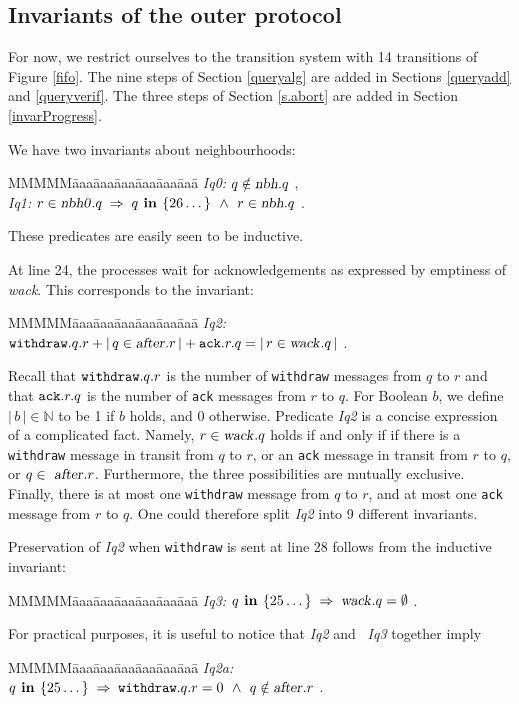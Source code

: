 \documentclass[10pt]{article} \usepackage[english]{babel}
\newenvironment{tab}{\begin{tabbing}
MMMMM\=aaa\=aaa\=aaa\=aaa\=aaa\=aaa\= \kill}{\end{tabbing}}
\def\Nat   {\mbox{$\mathbb{N}$}}
\def\S #1/{\mbox {\textsl{#1}}}
\def\B #1/{\mbox {\textbf{#1}}}
\def\T #1/{\mbox {\texttt{#1}}}
\def\Implies{\;\Rightarrow\;}
\def\Land   {\mbox{ $\;\land\;$ }}
\begin{document}
\subsection {Invariants of the outer protocol}
\label{InvOuter} 

For now, we restrict ourselves to the transition system with 14
transitions of Figure \ref{fifo}.  The nine steps of Section
\ref{queryalg} are added in Sections \ref{queryadd} and
\ref{queryverif}.  The three steps of Section \ref{s.abort} are added
in Section \ref{invarProgress}.

We have two invariants about neighbourhoods:
\begin{tab}
\S Iq0:/ \> $ q\notin \S nbh/.q$ ,\\
\S Iq1:/ \> $ r\in \S nbh0/.q \Implies q\B\ in /\{26\dots\} 
\Land r\in \S nbh/.q$ . 
\end{tab}
These predicates are easily seen to be inductive.

At line 24, the processes wait for acknowledgements as expressed by
emptiness of \S wack/. This corresponds to the invariant:
\begin{tab}
\S Iq2:/ \> $ \T withdraw/.q.r + |\,q\in\S after/.r\,| + \T ack/.r.q
= |\,r\in\S wack/.q\,| $ .
\end{tab}
Recall that $\T withdraw/.q.r$ is the number of \T withdraw/ messages
from $q$ to $r$ and that $\T ack/.r.q$ is the number of \T ack/
messages from $r$ to $q$.  For Boolean $b$, we define $|\,b\,|\in\Nat$
to be 1 if $b$ holds, and 0 otherwise.  Predicate \S Iq2/ is a concise
expression of a complicated fact.  Namely, $r\in\S wack/.q$ holds if
and only if if there is a \T withdraw/ message in transit from $q$ to
$r$, or an \T ack/ message in transit from $r$ to $q$, or $q\in\S
after/.r$.  Furthermore, the three possibilities are mutually
exclusive. Finally, there is at most one \T withdraw/ message from $q$
to $r$, and at most one \T ack/ message from $r$ to $q$.  One could
therefore split \S Iq2/ into 9 different invariants.

Preservation of \S Iq2/ when \T withdraw/ is sent at line 28 follows
from the inductive invariant:
\begin{tab}
\S Iq3:/ \> $ q\B\ in /\{25\dots\} \Implies \S wack/.q = \emptyset $ .
\end{tab}

For practical purposes, it is useful to notice that \S Iq2/ and \S
Iq3/ together imply
\begin{tab}
\S Iq2a:/ \> $ q\B\ in /\{25\dots\} \Implies \T withdraw/.q.r = 0 \Land 
q \notin\S after/.r $ .
\end{tab}
\end{document}

